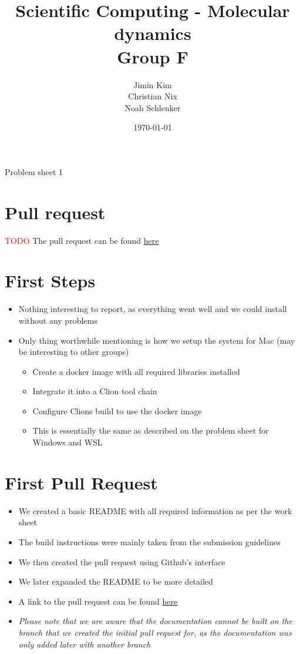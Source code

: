 \documentclass{article}
\title{Scientific Computing - Molecular dynamics \\ Group F}
\author{
    Jimin Kim \\
    Christian Nix \\
    Noah Schlenker
}
\date{\today}
\newcommand{\subtitle}{Problem sheet 1}
\begin{document}
\maketitle

\begin{center}
    \LARGE \subtitle{}
\end{center}

\section{Pull request}
\textcolor{red}{TODO}
The pull request can be found \href{www.google.com}{here}

\section{First Steps}

\begin{itemize}
    \item Nothing interesting to report, as everything went well and we could install without any problems
    \item Only thing worthwhile mentioning is how we setup the system for Mac (may be interesting to other groups)
    \begin{itemize}
        \item Create a docker image with all required libraries installed
        \item Integrate it into a Clion tool chain
        \item Configure Clions build to use the docker image
        \item This is essentially the same as described on the problem sheet for Windows and WSL 
    \end{itemize}
\end{itemize}

\section{First Pull Request}

\begin{itemize}
    \item We created a basic README with all required information as per the work sheet
    \item The build instructions were mainly taken from the submission guidelines
    \item We then created the pull request using Github's interface
    \item We later expanded the README to be more detailed
    \item A link to the pull request can be found \href{https://github.com/noahpy/MolSim-SS24/pull/1}{here}
    \item \emph{Please note that we are aware that the documentation cannot be built on the branch that we created the initial pull request for, as the documentation was only added later with another branch}
\end{itemize}
\end{document}
